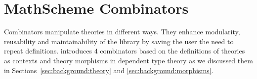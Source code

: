 \section{MathScheme Combinators}
\label{sec:msCombinators}

Combinators manipulate theories in different ways. They enhance modularity, reusability and maintainability of the library by saving the user the need to repeat definitions. \cite{carette2018building} introduces $4$ combinators based on the definitions of theories as contexts and theory morphisms in dependent type theory as we discussed them in Sections~\ref{sec:background:theory} and \ref{sec:background:morphisms}. %


